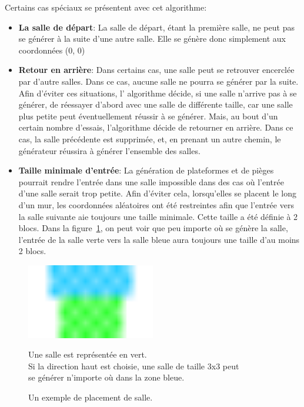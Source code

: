 \documentclass[10pt]{report}
\begin{document}
Certains cas spéciaux se présentent avec cet algorithme:
\begin{itemize}
  \item \textbf{La salle de départ}: La salle de départ, étant la première
  salle, ne peut pas se générer à la suite d'une autre salle. Elle se 
  génère donc simplement aux coordonnées (0, 0)
  \item \textbf{Retour en arrière}: Dans certains cas, une salle peut se 
  retrouver encerclée par d'autre salles. Dans ce cas, aucune salle ne 
  pourra se générer par la suite. Afin d'éviter ces situations, l'
  algorithme décide, si une salle n'arrive pas à se générer, de réessayer 
  d'abord avec une salle de différente taille, car une salle plus petite
  peut éventuellement réussir à se générer. Mais, au bout d'un certain 
  nombre d'essais, l'algorithme décide de retourner en arrière. Dans ce
  cas, la salle précédente est supprimée, et, en prenant un autre chemin,
  le générateur réussira à générer l'ensemble des salles.
  \item \textbf{Taille minimale d'entrée}: La génération de plateformes et 
  de pièges pourrait rendre l'entrée dans une salle impossible dans des cas
  où l'entrée d'une salle serait trop petite. Afin d'éviter cela,
  lorsqu'elles se placent le long d'un mur, les coordonnées aléatoires ont
  été restreintes afin que l'entrée vers la salle suivante aie toujours
  une taille minimale. Cette taille a été définie à 2 blocs. Dans la
  figure~\ref{fig:room_placement}, on peut voir que peu importe où se génère la
  salle, l'entrée de la salle verte vers la salle bleue aura toujours une
  taille d'au moins 2 blocs.
\end{itemize}

\begin{figure}[H]
  \centering
  \includegraphics[width=0.5\textwidth]{images/room_placement.png}
  \caption{Un exemple de placement de salle.}
  Une salle est représentée en vert.\\ 
  Si la direction haut est choisie, une salle de taille 3x3 peut\\
  se générer n'importe où dans la zone bleue.
  \label{fig:room_placement}
\end{figure}
\end{document}
